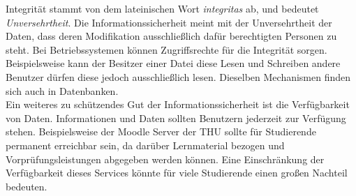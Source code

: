 \documentclass[
    12pt, %
    DIV10,
    ngerman, %
    a4paper, %
    oneside, %
    titlepage, %
    parskip=half, %
    headings=normal, %
    listof=totoc, %
    bibliography=totoc, %
    index=totoc, %
    captions=tableheading, %
    final %
]{scrreprt}
\begin{document}
Integrität stammt von dem lateinischen Wort \emph{integritas} ab, und bedeutet \emph{Unversehrtheit}. Die Informationssicherheit meint mit der Unversehrtheit der Daten, dass deren Modifikation ausschlie{\ss}lich dafür berechtigten Personen zu steht. Bei Betriebssystemen können Zugriffsrechte für die Integrität sorgen. Beispielsweise kann der Besitzer einer Datei diese Lesen und Schreiben andere Benutzer dürfen diese jedoch ausschlie{\ss}lich lesen. Dieselben Mechanismen finden sich auch in Datenbanken.\\
Ein weiteres zu schützendes Gut der Informationssicherheit ist die Verfügbarkeit von Daten. Informationen und Daten sollten Benutzern jederzeit zur Verfügung stehen. Beispielsweise der Moodle Server der THU sollte für Studierende permanent erreichbar sein, da darüber Lernmaterial bezogen und Vorprüfungsleistungen abgegeben werden können. Eine Einschränkung der Verfügbarkeit dieses Services könnte für viele Studierende einen gro{\ss}en Nachteil bedeuten.\\\\
\end{document}
